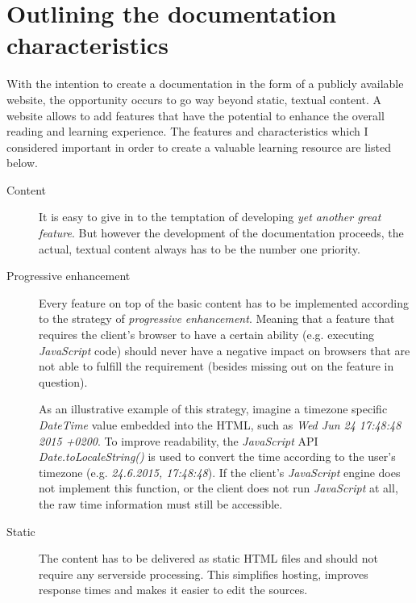 \section{Outlining the documentation characteristics}

With the intention to create a documentation in the form of a publicly available website, the opportunity occurs to go way beyond static, textual content. A website allows to add features that have the potential to enhance the overall reading and learning experience. The features and characteristics which I considered important in order to create a valuable learning resource are listed below.

\begin{description}

	\item[Content]\hfill

	It is easy to give in to the temptation of developing \textit{yet another great feature}. But however the development of the documentation proceeds, the actual, textual content always has to be the number one priority.

	\item[Progressive enhancement]\hfill

	Every feature on top of the basic content has to be implemented according to the strategy of \textit{progressive enhancement}. Meaning that a feature that requires the client's browser to have a certain ability (e.g. executing \textit{JavaScript} code) should never have a negative impact on browsers that are not able to fulfill the requirement (besides missing out on the feature in question).

	As an illustrative example of this strategy, imagine a timezone specific \textit{DateTime} value embedded into the \ac{HTML}, such as \textit{Wed Jun 24 17:48:48 2015 +0200}. To improve readability, the \textit{JavaScript} \ac{API} \textit{Date.toLocaleString()} is used to convert the time according to the user's timezone (e.g. \textit{24.6.2015, 17:48:48}). If the client's \textit{JavaScript} engine does not implement this function, or the client does not run \textit{JavaScript} at all, the raw time information must still be accessible.

	\item[Static]\hfill

	The content has to be delivered as static \ac{HTML} files and should not require any serverside processing. This simplifies hosting, improves response times and makes it easier to edit the sources.


\end{description}
